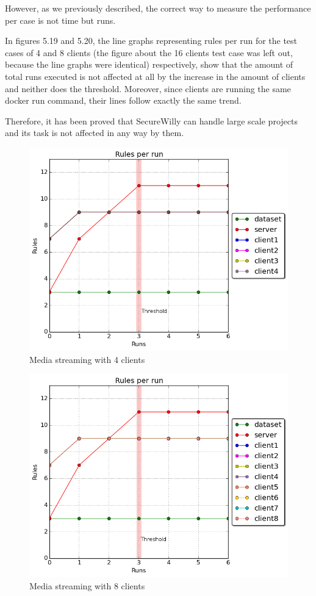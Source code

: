 However, as we previously described, the correct way to measure the performance per case is not time but runs.

In figures 5.19 and 5.20, the line graphs representing rules per run for the test cases of 4 and 8 clients (the figure about the 16 clients test case was left out, because the line graphs were identical) respectively, show that the amount of total runs executed is not affected at all by the increase in the amount of clients and neither does the threshold. Moreover, since clients are running the same docker run command, their lines follow exactly the same trend.

Therefore, it has been proved that SecureWilly can handle large scale projects and its task is not affected in any way by them.

\begin{figure}[h!]
  \centering
   \includegraphics[width=0.65\linewidth]{../figures/scalability/rules_4_t.png}
   \caption{Media streaming with 4 clients}
\end{figure}
\hfill\break\hfill\break
\begin{figure}[h!]
  \centering
   \includegraphics[width=0.68\linewidth]{../figures/scalability/rules_8_t.png}
   \caption{Media streaming with 8 clients}
\end{figure}

